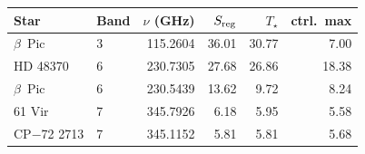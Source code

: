 \begin{tabular}{@{}llrrrr@{}}
\toprule
Star & Band & $\nu$ (GHz) & $S_{\rm reg}$ & $T_\star$ & ctrl.\ max \\
\midrule
$\beta$~Pic & 3 & 115.2604 & 36.01 & 30.77 & 7.00 \\
HD 48370 & 6 & 230.7305 & 27.68 & 26.86 & 18.38 \\
$\beta$~Pic & 6 & 230.5439 & 13.62 & 9.72 & 8.24 \\
61 Vir & 7 & 345.7926 & 6.18 & 5.95 & 5.58 \\
CP$-$72 2713 & 7 & 345.1152 & 5.81 & 5.81 & 5.68 \\
\bottomrule
\end{tabular}
